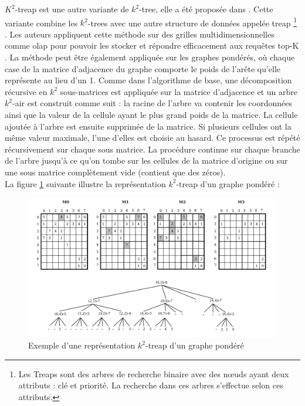 $K^2$-treap est une autre variante de $k^2$-tree, elle a été proposée dans \citep{brisaboa2014k}. Cette variante combine les $k^2$-trees avec une autre structure de données appelée treap \footnote{Les Treaps sont des arbres de recherche binaire avec des nœuds ayant deux attributs : clé et priorité. La recherche dans ces arbres s'effectue selon ces attributs.} \citep{aragon1989randomized}. Les auteurs appliquent cette méthode sur des grilles multidimensionnelles comme 
\gls{olap} pour pouvoir les stocker et répondre efficacement aux requêtes top-K \citep{badr2013traitement}. La méthode peut être également appliquée sur les graphes pondérés, où chaque case de la matrice d'adjacence du graphe comporte le poids de l'arête qu'elle représente au lieu d'un 1.
Comme dans l'algorithme de base, une décomposition récursive en $k^2$ sous-matrices est appliquée sur la matrice d'adjacence et un arbre $k^2$-air est construit comme suit : la racine de l'arbre va contenir les coordonnées ainsi que la valeur de la cellule ayant le plus grand poids de la matrice. La cellule ajoutée à l'arbre est ensuite supprimée de la matrice. Si plusieurs cellules ont la même valeur maximale, l'une d'elles est choisie au hasard. Ce processus est répété récursivement sur chaque sous matrice. La procédure continue sur chaque branche de l'arbre jusqu'à ce qu'on tombe sur les cellules de la matrice d'origine ou sur une sous matrice complètement vide (contient que des zéros).\\
La figure \ref{k2-treaps} suivante illustre la représentation $k^2$-treap d'un graphe pondéré \citep{badr2013traitement} :

\begin{figure}[H]
\begin{center}
\includegraphics[height=200 pt, width=380 pt]{./ressources/image/k2-treaps.png} 
\end{center}
\caption{Exemple d'une représentation $k^2$-treap d'un graphe pondéré}
\label{k2-treaps}
\end{figure}

